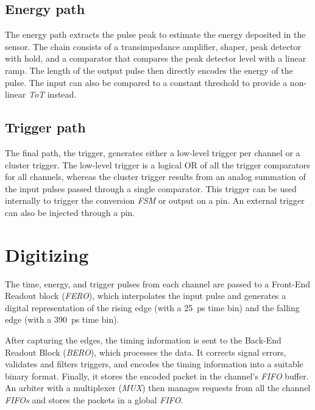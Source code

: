 \subsection{Energy path}
The energy path extracts the pulse peak to estimate the energy deposited in the sensor. The chain consists of a transimpedance amplifier, shaper, peak detector with hold, and a comparator that compares the peak detector level with a linear ramp. The length of the output pulse then directly encodes the energy of the pulse. The input can also be compared to a constant threshold to provide a non-linear \emph{ToT} instead. 

\subsection{Trigger path}
The final path, the trigger, generates either a low-level trigger per channel or a cluster trigger. The low-level trigger is a logical OR of all the trigger comparators for all channels, whereas the cluster trigger results from an analog summation of the input pulses passed through a single comparator. This trigger can be used internally to trigger the conversion \emph{FSM} or output on a pin. An external trigger can also be injected through a pin.



\section{Digitizing}
\label{sec:fastic_digitizing}
The time, energy, and trigger pulses from each channel are passed to a Front-End Readout block (\emph{FERO}), which interpolates the input pulse and generates a digital representation of the rising edge (with a \SI{25}{\pico\second} time bin) and the falling edge (with a \SI{390}{\pico\second} time bin).

After capturing the edges, the timing information is sent to the Back-End Readout Block (\emph{BERO}), which processes the data. It corrects signal errors, validates and filters triggers, and encodes the timing information into a suitable binary format. Finally, it stores the encoded packet in the channel's \emph{FIFO} buffer. An arbiter with a multiplexer (\emph{MUX}) then manages requests from all the channel \emph{FIFOs} and stores the packets in a global \emph{FIFO}.

